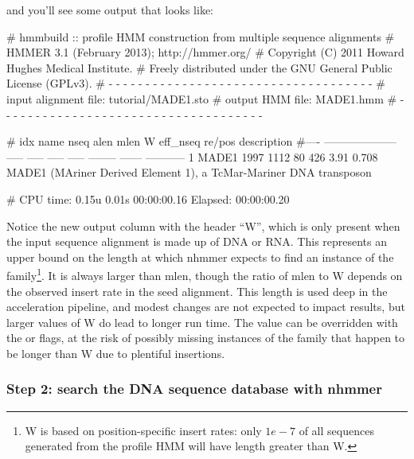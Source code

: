 
and you'll see some output that looks like:

\begin{samepage}
\begin{sreoutput}
# hmmbuild :: profile HMM construction from multiple sequence alignments
# HMMER 3.1 (February 2013); http://hmmer.org/
# Copyright (C) 2011 Howard Hughes Medical Institute.
# Freely distributed under the GNU General Public License (GPLv3).
# - - - - - - - - - - - - - - - - - - - - - - - - - - - - - - - - - - - -
# input alignment file:             tutorial/MADE1.sto
# output HMM file:                  MADE1.hmm
# - - - - - - - - - - - - - - - - - - - - - - - - - - - - - - - - - - - -

# idx name                  nseq  alen  mlen     W eff_nseq re/pos description
#---- -------------------- ----- ----- ----- ----- -------- ------ -----------
1     MADE1                 1997  1112    80   426     3.91  0.708 MADE1 (MAriner Derived Element 1), a TcMar-Mariner DNA transposon

# CPU time: 0.15u 0.01s 00:00:00.16 Elapsed: 00:00:00.20
\end{sreoutput}
\end{samepage}

Notice the new output column with the header ``W'', which is only present when
the input sequence alignment is made up of DNA or RNA. This represents an upper
bound on the length at which nhmmer expects to find an instance of the 
family\footnote{W is based on position-specific insert rates: only
$1e-7$ of all sequences generated from the profile HMM will have length 
greater than W.}. 
It is always larger than mlen, though the ratio of mlen to W depends on the
observed insert rate in the seed alignment. This length is used deep in the
acceleration pipeline, and modest changes are not expected to impact results,
but larger values of W do lead to longer run time. The value can be overridden
with the  or  flags, at the risk of
possibly missing instances of the family that happen to be longer than W due to
plentiful insertions.



\subsubsection{Step 2: search the DNA sequence database with nhmmer}

